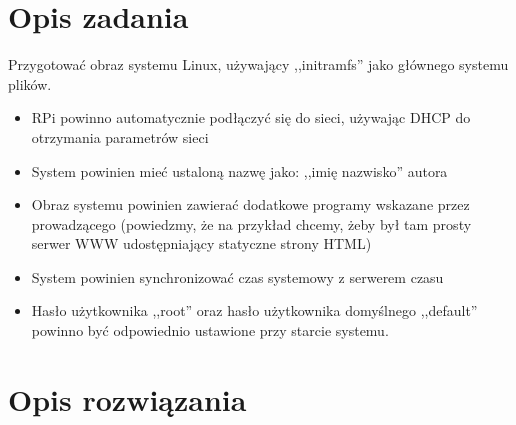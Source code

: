 
\usepackage{listings}

\maketitle
\tableofcontents

\newpage

\section{Opis zadania}
Przygotować obraz systemu Linux, używający ,,initramfs'' jako głównego systemu plików.
\begin{itemize}
\item RPi powinno automatycznie podłączyć się do sieci, używając DHCP do otrzymania parametrów sieci
\item System powinien mieć ustaloną nazwę jako: ,,imię nazwisko'' autora
\item Obraz systemu powinien zawierać dodatkowe programy wskazane przez prowadzącego (powiedzmy, że na przykład chcemy, żeby był tam prosty serwer WWW udostępniający statyczne strony HTML)
\item System powinien synchronizować czas systemowy z serwerem czasu
\item Hasło użytkownika ,,root'' oraz hasło użytkownika domyślnego ,,default'' powinno być odpowiednio ustawione przy starcie systemu.
\end{itemize}

\section{Opis rozwiązania}

